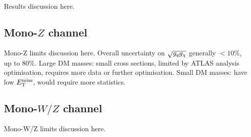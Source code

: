 Results discussion here.

\subsection{Mono-$Z$ channel}

Mono-Z limits discussion here. Overall uncertainty on $\sqrt{g_q g_{\chi}}$ generally $ < 10\%$, up to 80$\%$. Large DM masses: small cross sections, limited by ATLAS analysis optimisation, requires more data or further optimisation. Small DM masses: have low $E_{\mathrm{T}}^{\mathrm{miss}}$, would require more statistics.

\subsection{Mono-$W/Z$ channel}

Mono-W/Z limits discussion here.
\afterpage{\clearpage}


